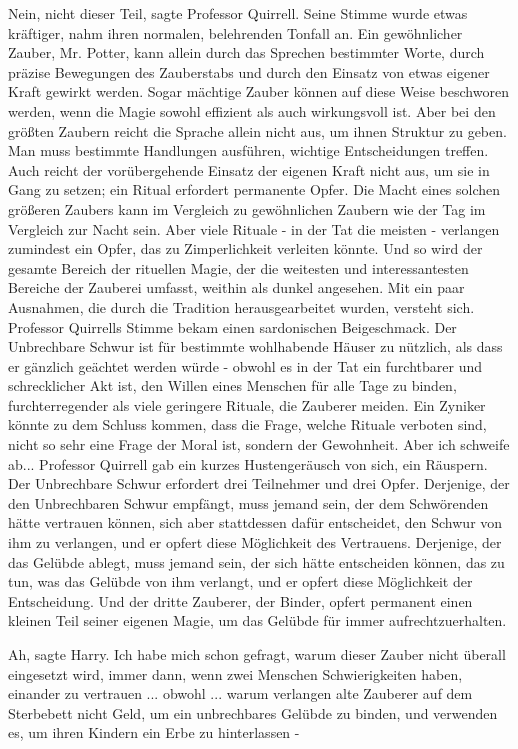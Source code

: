\glqq{}Nein, nicht dieser Teil\grqq{}, sagte Professor Quirrell. Seine Stimme
wurde etwas kräftiger, nahm ihren normalen, belehrenden Tonfall an. \glqq{}Ein
gewöhnlicher Zauber, Mr. Potter, kann allein durch das Sprechen bestimmter
Worte, durch präzise Bewegungen des Zauberstabs und durch den Einsatz von etwas
eigener Kraft gewirkt werden. Sogar mächtige Zauber können auf diese Weise
beschworen werden, wenn die Magie sowohl effizient als auch wirkungsvoll ist.
Aber bei den größten Zaubern reicht die Sprache allein nicht aus, um ihnen
Struktur zu geben. Man muss bestimmte Handlungen ausführen, wichtige
Entscheidungen treffen. Auch reicht der vorübergehende Einsatz der eigenen Kraft
nicht aus, um sie in Gang zu setzen; ein Ritual erfordert permanente Opfer. Die
Macht eines solchen größeren Zaubers kann im Vergleich zu gewöhnlichen Zaubern
wie der Tag im Vergleich zur Nacht sein. Aber viele Rituale - in der Tat die
meisten - verlangen zumindest ein Opfer, das zu Zimperlichkeit verleiten könnte.
Und so wird der gesamte Bereich der rituellen Magie, der die weitesten und
interessantesten Bereiche der Zauberei umfasst, weithin als dunkel angesehen.
Mit ein paar Ausnahmen, die durch die Tradition herausgearbeitet wurden,
versteht sich.\grqq{} Professor Quirrells Stimme bekam einen sardonischen
Beigeschmack. \glqq{}Der Unbrechbare Schwur ist für bestimmte wohlhabende Häuser
zu nützlich, als dass er gänzlich geächtet werden würde - obwohl es in der Tat
ein furchtbarer und schrecklicher Akt ist, den Willen eines Menschen für alle
Tage zu binden, furchterregender als viele geringere Rituale, die Zauberer
meiden. Ein Zyniker könnte zu dem Schluss kommen, dass die Frage, welche Rituale
verboten sind, nicht so sehr eine Frage der Moral ist, sondern der Gewohnheit.
Aber ich schweife ab...\grqq{} Professor Quirrell gab ein kurzes Hustengeräusch
von sich, ein Räuspern. \glqq{}Der Unbrechbare Schwur erfordert drei Teilnehmer
und drei Opfer. Derjenige, der den Unbrechbaren Schwur empfängt, muss jemand
sein, der dem Schwörenden hätte vertrauen können, sich aber stattdessen dafür
entscheidet, den Schwur von ihm zu verlangen, und er opfert diese Möglichkeit
des Vertrauens. Derjenige, der das Gelübde ablegt, muss jemand sein, der sich
hätte entscheiden können, das zu tun, was das Gelübde von ihm verlangt, und er
opfert diese Möglichkeit der Entscheidung. Und der dritte Zauberer, der Binder,
opfert permanent einen kleinen Teil seiner eigenen Magie, um das Gelübde für
immer aufrechtzuerhalten.\grqq{}

\glqq{}Ah\grqq{}, sagte Harry. \glqq{}Ich habe mich schon gefragt, warum dieser
Zauber nicht überall eingesetzt wird, immer dann, wenn zwei Menschen
Schwierigkeiten haben, einander zu vertrauen ... obwohl ... warum verlangen alte
Zauberer auf dem Sterbebett nicht Geld, um ein unbrechbares Gelübde zu binden,
und verwenden es, um ihren Kindern ein Erbe zu hinterlassen -\grqq{}

